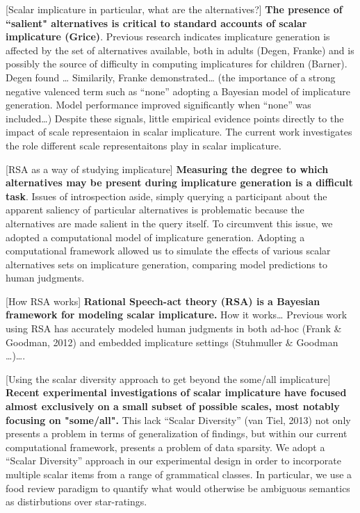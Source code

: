 \documentclass[10pt, letterpaper]{article}
\begin{document}
{[}Scalar implicature in particular, what are the
alternatives?{]}\newline
\textbf{The presence of ``salient" alternatives is critical to standard accounts of scalar implicature (Grice)}.
Previous research indicates implicature generation is affected by the
set of alternatives available, both in adults (Degen, Franke) and is
possibly the source of difficulty in computing implicatures for children
(Barner). Degen found \ldots{} Similarily, Franke demonstrated\ldots{}
(the importance of a strong negative valenced term such as ``none''
adopting a Bayesian model of implicature generation. Model performance
improved significantly when ``none'' was included\ldots{}) Despite these
signals, little empirical evidence points directly to the impact of
scale representaion in scalar implicature. The current work investigates
the role different scale representaitons play in scalar implicature.

{[}RSA as a way of studying implicature{]}\newline
\textbf{Measuring the degree to which alternatives may be present during implicature generation is a difficult task}.
Issues of introspection aside, simply querying a participant about the
apparent saliency of particular alternatives is problematic because the
alternatives are made salient in the query itself. To circumvent this
issue, we adopted a computational model of implicature generation.
Adopting a computational framework allowed us to simulate the effects of
various scalar alternatives sets on implicature generation, comparing
model predictions to human judgments.

{[}How RSA works{]}\newline
\textbf{Rational Speech-act theory (RSA) is a Bayesian framework for modeling scalar implicature.}
How it works\ldots{} Previous work using RSA has accurately modeled
human judgments in both ad-hoc (Frank \& Goodman, 2012) and embedded
implicature settings (Stuhmuller \& Goodman \ldots{})\ldots{}.

{[}Using the scalar diversity approach to get beyond the some/all
implicature{]}\newline
\textbf{Recent experimental investigations of scalar implicature have focused almost exclusively on a small subset of possible scales, most notably focusing on "some/all".}
This lack ``Scalar Diversity'' (van Tiel, 2013) not only presents a
problem in terms of generalization of findings, but within our current
computational framework, presents a problem of data sparsity. We adopt a
``Scalar Diversity'' approach in our experimental design in order to
incorporate multiple scalar items from a range of grammatical classes.
In particular, we use a food review paradigm to quantify what would
otherwise be ambiguous semantics as distirbutions over star-ratings.
\end{document}
